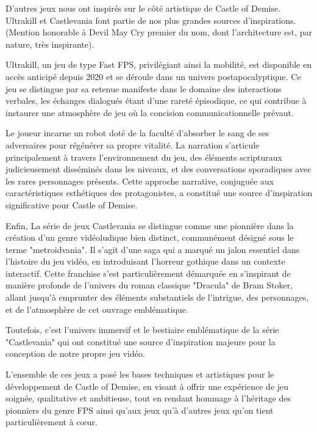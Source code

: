 \documentclass{report}
\begin{document}
D’autres jeux nous ont inspirés sur le côté artistique de Castle of Demise. Ultrakill et Castlevania font partie de nos plus grandes sources d’inspirations. (Mention honorable à Devil May Cry premier du nom, dont l’architecture est, par nature, très inspirante). \newline

Ultrakill, un jeu de type Fast FPS, privilégiant ainsi la mobilité, est disponible en accès anticipé depuis 2020 et se déroule dans un univers postapocalyptique. Ce jeu se distingue par sa retenue manifeste dans le domaine des interactions verbales, les échanges dialogués étant d’une rareté épisodique, ce qui contribue à instaurer une atmosphère de
jeu où la concision communicationnelle prévaut. \newline

 Le joueur incarne un robot doté de la faculté d’absorber le sang de ses adversaires pour régénérer sa propre vitalité. La narration s’articule principalement à travers l’environnement du jeu, des éléments scripturaux judicieusement disséminés dans les niveaux, et des conversations sporadiques avec les
rares personnages présents. Cette approche narrative, conjuguée aux caractéristiques esthétiques des protagonistes, a constitué une source d’inspiration significative pour
Castle of Demise. \newline

Enfin, La série de jeux Castlevania se distingue comme une pionnière dans la création d’un genre vidéoludique bien distinct, communément désigné sous le terme "metroidvania".
Il s’agit d’une saga qui a marqué un jalon essentiel dans l’histoire du jeu vidéo, en introduisant l’horreur gothique dans un contexte interactif. Cette franchise s’est particulièrement démarquée en s’inspirant de manière profonde de l’univers du roman classique "Dracula" de Bram Stoker, allant jusqu’à emprunter des éléments substantiels de l’intrigue, des personnages, et de l’atmosphère de cet ouvrage emblématique. \newline

Toutefois, c’est l’univers immersif et le bestiaire emblématique de la série "Castlevania" qui ont constitué une source d’inspiration majeure pour la conception de notre propre jeu vidéo. \newline

L’ensemble de ces jeux a posé les bases techniques et artistiques pour le développement de Castle of Demise, en visant à offrir une expérience de jeu soignée, qualitative et ambitieuse, tout en rendant hommage à l’héritage des pionniers du genre FPS ainsi qu’aux jeux qu’à d’autres jeux qu’on tient particulièrement à cœur. \newline
\end{document}
